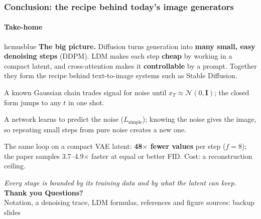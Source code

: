 \documentclass[aspectratio=169,9pt,xcolor=table]{beamer}
\newcommand{\Normal}{\mathcal{N}}
\newcommand{\Id}{\mathbf{I}}
\begin{document}
\begin{frame}
\frametitle{Conclusion: the recipe behind today's image generators}
\framesubtitle{Take-home}
\begin{nbox}[colframe=hcmusblue,colback=lightblue,fontupper=\small]{hcmusblue}
\textbf{The big picture.} Diffusion turns generation into \textbf{many small, easy denoising steps} (DDPM). LDM makes each step \textbf{cheap} by working in a compact latent, and cross-attention makes it \textbf{controllable} by a prompt. Together they form the recipe behind text-to-image systems such as Stable Diffusion.
\end{nbox}
\vspace{1.5mm}
\begin{tcbraster}[raster columns=3,raster equal height,raster column skip=2.5mm,raster before skip=0pt,raster after skip=0pt,
  raster every box/.style={base,fontupper=\footnotesize\raggedright,coltitle=white}]
\begin{tcolorbox}[colframe=fwd,colback=fwd!5!white,title={1. Forward noising}]
A known Gaussian chain trades signal for noise until $x_T\approx\Normal(0,\Id)$; the closed form jumps to any $t$ in one shot.
\end{tcolorbox}
\begin{tcolorbox}[colframe=rev,colback=rev!5!white,title={2. Reverse denoising}]
A network learns to predict the noise ($L_{\text{simple}}$); knowing the noise gives the image, so repeating small steps from pure noise creates a new one.
\end{tcolorbox}
\begin{tcolorbox}[colframe=ok,colback=ok!5!white,title={3. Latent diffusion}]
The same loop on a compact VAE latent: \textbf{48$\times$ fewer values} per step ($f=8$); the paper samples 3.7--4.9$\times$ faster at equal or better FID. Cost: a reconstruction ceiling.
\end{tcolorbox}
\end{tcbraster}
\vspace{1.5mm}
\begin{center}
{\small\itshape Every stage is bounded by its training data and by what the latent can keep.}\\[1.5mm]
{\large\bfseries\color{hcmusblue}Thank you \textperiodcentered{} Questions?}\\[0.5mm]{\scriptsize\color{muted}Notation, a denoising trace, LDM formulas, references and figure sources: backup slides}
\end{center}
\end{frame}
\end{document}

